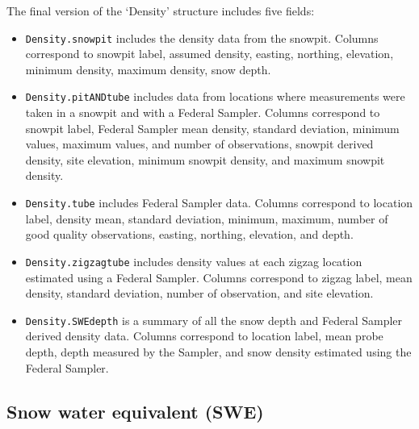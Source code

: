 \documentclass[12pt]{article}
\begin{document}
The final version of the `Density' structure includes five fields:
\begin{itemize}
\item[]\texttt{Density.snowpit} includes the density data from the snowpit. Columns correspond to snowpit label, assumed density, easting, northing, elevation, minimum density, maximum density, snow depth.
\item[]\texttt{Density.pitANDtube} includes data from locations where measurements were taken in a snowpit and with a Federal Sampler. Columns correspond to snowpit label, Federal  Sampler mean density, standard deviation, minimum values, maximum values, and number of observations, snowpit derived density, site elevation, minimum snowpit density, and maximum snowpit density.
\item[]\texttt{Density.tube} includes Federal Sampler data. Columns correspond to location label, density mean, standard deviation, minimum, maximum, number of good quality observations, easting, northing, elevation, and depth. 
\item[]\texttt{Density.zigzagtube} includes density values at each zigzag location estimated using a Federal Sampler. Columns correspond to zigzag label, mean density, standard deviation, number of observation, and site elevation. 
\item[]\texttt{Density.SWEdepth} is a summary of all the snow depth and Federal Sampler derived density data. Columns correspond to location label, mean probe depth, depth measured by the Sampler, and snow density estimated using the Federal Sampler. 
\end{itemize}

\subsection{Snow water equivalent (SWE)}
\end{document}

